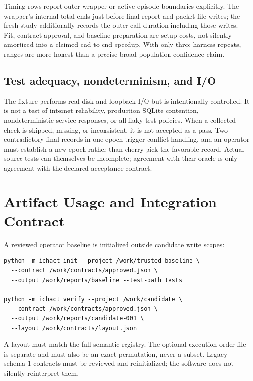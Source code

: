 Timing rows report outer-wrapper or active-episode boundaries explicitly. The wrapper's internal total ends just before final report and packet-file writes; the fresh study additionally records the outer call duration including those writes. Fit, contract approval, and baseline preparation are setup costs, not silently amortized into a claimed end-to-end speedup. With only three harness repeats, ranges are more honest than a precise broad-population confidence claim.

\subsection{Test adequacy, nondeterminism, and I/O}
The fixture performs real disk and loopback I/O but is intentionally controlled. It is not a test of internet reliability, production SQLite contention, nondeterministic service responses, or all flaky-test policies. When a collected check is skipped, missing, or inconsistent, it is not accepted as a pass. Two contradictory final records in one epoch trigger conflict handling, and an operator must establish a new epoch rather than cherry-pick the favorable record. Actual source tests can themselves be incomplete; agreement with their oracle is only agreement with the declared acceptance contract.

\section{Artifact Usage and Integration Contract}
A reviewed operator baseline is initialized outside candidate write scopes:
\begin{samepage}
\begin{verbatim}
python -m ichact init --project /work/trusted-baseline \
  --contract /work/contracts/approved.json \
  --output /work/reports/baseline --test-path tests

python -m ichact verify --project /work/candidate \
  --contract /work/contracts/approved.json \
  --output /work/reports/candidate-001 \
  --layout /work/contracts/layout.json
\end{verbatim}
\end{samepage}
A layout must match the full semantic registry. The optional execution-order file is separate and must also be an exact permutation, never a subset. Legacy schema-1 contracts must be reviewed and reinitialized; the software does not silently reinterpret them.

